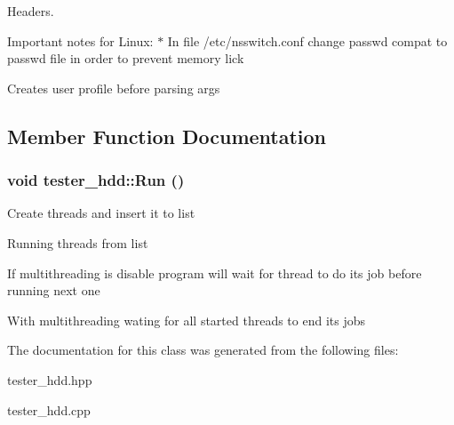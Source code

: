 Headers. 

Important notes for Linux: $\ast$ In file /etc/nsswitch.conf change passwd compat to passwd file in order to prevent memory lick 

Creates user profile before parsing args 



\subsection{Member Function Documentation}
\hypertarget{classtester__hdd_abfdcc395e8be504dfd0ea686da790375}{
\subsubsection[{Run}]{\setlength{\rightskip}{0pt plus 5cm}void tester\_\-hdd::Run ()}}
\label{classtester__hdd_abfdcc395e8be504dfd0ea686da790375}


Create threads and insert it to list

Running threads from list

If multithreading is disable program will wait for thread to do its job before running next one

With multithreading wating for all started threads to end its jobs 



The documentation for this class was generated from the following files:\begin{DoxyCompactItemize}
\item 
tester\_\-hdd.hpp\item 
tester\_\-hdd.cpp\end{DoxyCompactItemize}
